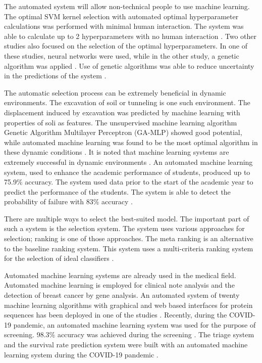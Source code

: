\documentclass[a4paper,fleqn]{cas-dc}
\begin{document}
The automated system will allow non-technical people to use machine learning. The optimal SVM kernel selection with automated optimal hyperparameter calculations was performed with minimal human interaction. The system was able to calculate up to 2 hyperparameters with no human interaction \cite{ref_paper_3}. Two other studies also focused on the selection of the optimal hyperparameters. In one of these studies, neural networks were used, while in the other study, a genetic algorithm was applied \cite{ref_paper_a_14,ref_paper_39}. Use of genetic algorithms was able to reduce uncertainty in the predictions of the system \cite{ref_paper_39}.

The automatic selection process can be extremely beneficial in dynamic environments. The excavation of soil or tunneling is one such environment. The displacement induced by excavation was predicted by machine learning with properties of soli as features. The unsupervised machine learning algorithm Genetic Algorithm Multilayer Perceptron (GA-MLP) showed good potential, while automated machine learning was found to be the most optimal algorithm in these dynamic conditions \cite{ref_paper_1}. It is noted that machine learning systems are extremely successful in dynamic environments \cite{ref_paper_1,ref_paper_13}. An automated machine learning system, used to enhance the academic performance of students, produced up to 75.9\% accuracy. The system used data prior to the start of the academic year to predict the performance of the students. The system is able to detect the probability of failure with 83\% accuracy \cite{ref_paper_a_7}.

There are multiple ways to select the best-suited model. The important part of such a system is the selection system. The system uses various approaches for selection; ranking is one of those approaches. The meta ranking is an alternative to the baseline ranking system. This system uses a multi-criteria ranking system for the selection of ideal classifiers \cite{ref_paper_23}.

Automated machine learning systems are already used in the medical field. Automated machine learning is employed for clinical note analysis \cite{ref_paper_a_2} and the detection of breast cancer \cite{ref_paper_a_6} by gene analysis. An automated system of twenty machine learning algorithms with graphical and web based interfaces for protein sequences has been deployed in one of the studies \cite{ref_paper_a_11}. Recently, during the COVID-19 pandemic, an automated machine learning system was used for the purpose of screening. 98.3\% accuracy was achieved during the screening \cite{ref_paper_a_15}. The triage system and the survival rate prediction system were built with an automated machine learning system during the COVID-19 pandemic \cite{ref_paper_a_9}.
\end{document}
